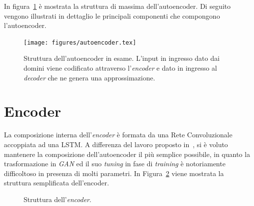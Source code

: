 In figura~\ref{fig:autoencoder1} è mostrata la struttura di massima dell'autoencoder. Di seguito vengono illustrati in dettaglio le principali componenti che compongono l'autoencoder. 

\begin{figure}[!p]
    \centering
	\texttt{[image: figures/autoencoder.tex]}
	\caption{Struttura dell'autoencoder in esame. L'input in ingresso dato dai domini viene codificato attraverso l'\textit{encoder} e dato in ingresso al \textit{decoder} che ne genera una approssimazione.
\label{fig:autoencoder1}}
\end{figure}

\newpage
\section{Encoder}
\label{encoder}
La composizione interna dell'\textit{encoder} è formata da una Rete Convoluzionale accoppiata ad una LSTM. A differenza del lavoro proposto in~\cite{deepdga}, si è voluto mantenere la composizione dell'autoencoder il più semplice possibile, in quanto la trasformazione in \textit{GAN} ed il suo \textit{tuning} in fase di \textit{training} è notoriamente difficoltoso in presenza di molti parametri. In Figura~\ref{fig:encoder} viene mostrata la struttura semplificata dell'encoder.

\begin{figure}[!bp]
    \centering
	
	\caption{Struttura dell'\textit{encoder}.
\label{fig:encoder}}
\end{figure}


